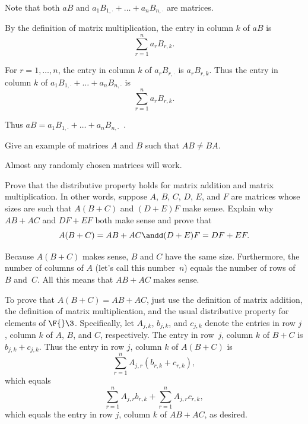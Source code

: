 \begin{Solution}
Note that both $aB$ and  $a_1 B_{1, \cdot} + \dots + a_n B_{n, \cdot}$ are  \mbox{matrices}.

By the  definition of matrix multiplication, the entry in column $k$ of $aB$ is
\[
\sum_{r=1}^n a_r B_{r, k}.
\]

For $r = 1, \dots, n$, the entry in column $k$ of $a_r B_{r, \cdot}$ is $a_r B_{r, k}$. Thus the entry in column $k$ of $a_1 B_{1, \cdot} + \dots + a_n B_{n, \cdot}$ is
\[
\sum_{r=1}^n a_r B_{r, k}.
\]

Thus $aB = a_1 B_{1, \cdot} + \dots + a_n B_{n, \cdot}$\ .
\end{Solution}


\exercise
Give an example of  matrices $A$ and $B$ such that $AB \ne BA$. \label{noncommute}

\begin{Solution}
Almost any randomly chosen  matrices will work.
\end{Solution}

\exercise
Prove that the distributive property holds for matrix addition and matrix
multiplication.  In other words, suppose $A$, $B$, $C$, $D$, $E$, and $F$ are matrices whose
sizes are such that $A(B+C)$ and $(D+E)F$ make sense.  Explain why $AB + AC$ and $DF + EF$ both make sense
and prove that\label{3distrib}
\[
A(B+C) = AB + AC \andd (D+E)F = DF + EF.
\]
\exercisedisplayend

\begin{Solution}
Because $A(B + C)$ makes sense, $B$ and $C$ have the same size.
Furthermore, the number of columns of $A$ (let's call this number~$n$) equals
the number of rows of $B$ and~$C$.  All this means that $AB + AC$ makes sense.

To prove that $A(B+C) = AB + AC$, just use the definition of matrix addition, the
definition of matrix multiplication, and the usual distributive property for
elements of $\F{}\3$.  Specifically, let $A_{j,k}$, $b_{j,k}$, and $c_{j,k}$ denote
the entries in row $j$, column $k$ of $A$, $B$, and $C$, respectively.  The entry
in row~$j$, column $k$ of $B + C$ is $b_{j,k} + c_{j,k}$.  Thus the entry in row
$j$, column $k$ of $A(B+C)$ is
\[
\sum_{r=1}^n A_{j,r} (b_{r,k} + c_{r,k}),
\]
which equals
\[
\sum_{r=1}^n A_{j,r} b_{r,k} + \sum_{r=1}^n A_{j,r} c_{r,k},
\]
which equals the entry in row $j$, column $k$ of $AB + AC$, as desired.
\end{Solution}

